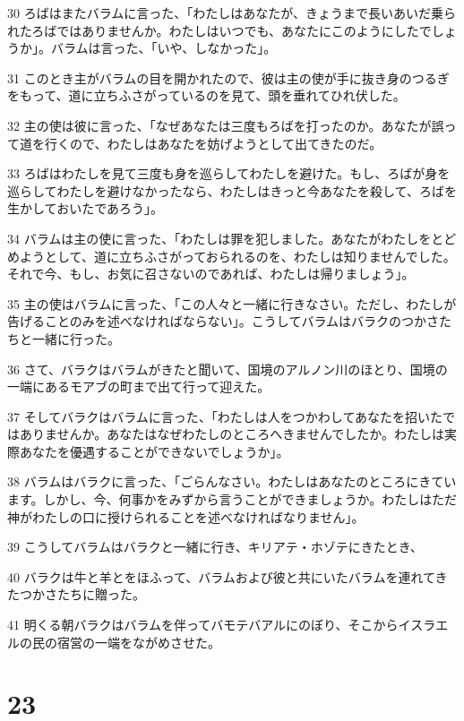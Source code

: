 \par 30 ろばはまたバラムに言った、「わたしはあなたが、きょうまで長いあいだ乗られたろばではありませんか。わたしはいつでも、あなたにこのようにしたでしょうか」。バラムは言った、「いや、しなかった」。
\par 31 このとき主がバラムの目を開かれたので、彼は主の使が手に抜き身のつるぎをもって、道に立ちふさがっているのを見て、頭を垂れてひれ伏した。
\par 32 主の使は彼に言った、「なぜあなたは三度もろばを打ったのか。あなたが誤って道を行くので、わたしはあなたを妨げようとして出てきたのだ。
\par 33 ろばはわたしを見て三度も身を巡らしてわたしを避けた。もし、ろばが身を巡らしてわたしを避けなかったなら、わたしはきっと今あなたを殺して、ろばを生かしておいたであろう」。
\par 34 バラムは主の使に言った、「わたしは罪を犯しました。あなたがわたしをとどめようとして、道に立ちふさがっておられるのを、わたしは知りませんでした。それで今、もし、お気に召さないのであれば、わたしは帰りましょう」。
\par 35 主の使はバラムに言った、「この人々と一緒に行きなさい。ただし、わたしが告げることのみを述べなければならない」。こうしてバラムはバラクのつかさたちと一緒に行った。
\par 36 さて、バラクはバラムがきたと聞いて、国境のアルノン川のほとり、国境の一端にあるモアブの町まで出て行って迎えた。
\par 37 そしてバラクはバラムに言った、「わたしは人をつかわしてあなたを招いたではありませんか。あなたはなぜわたしのところへきませんでしたか。わたしは実際あなたを優遇することができないでしょうか」。
\par 38 バラムはバラクに言った、「ごらんなさい。わたしはあなたのところにきています。しかし、今、何事かをみずから言うことができましょうか。わたしはただ神がわたしの口に授けられることを述べなければなりません」。
\par 39 こうしてバラムはバラクと一緒に行き、キリアテ・ホゾテにきたとき、
\par 40 バラクは牛と羊とをほふって、バラムおよび彼と共にいたバラムを連れてきたつかさたちに贈った。
\par 41 明くる朝バラクはバラムを伴ってバモテバアルにのぼり、そこからイスラエルの民の宿営の一端をながめさせた。

\chapter{23}

